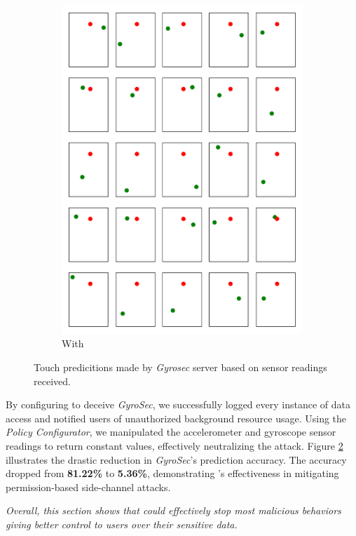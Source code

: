\begin{figure}
\begin{subfigure}{0.30\linewidth}
    \includegraphics[width=\linewidth]{Figures/Side Channel Attacks/touch_prediction_samples_by_GyroSec_with_Deceiver.pdf}
    \caption{With \framework{}}
    \label{fig:tchPredict_w_frmwrk}
\end{subfigure}
\caption{Touch predicitions made by \textit{Gyrosec} server based on sensor readings received.}
\label{fig:tchPredict}
\end{figure}

By configuring \framework{} to deceive \textit{GyroSec}, we successfully logged every instance of data access and notified users of unauthorized background resource usage. Using the \textit{Policy Configurator}, we manipulated the accelerometer and gyroscope sensor readings to return constant values, effectively neutralizing the attack. Figure \ref{fig:tchPredict} illustrates the drastic reduction in \textit{GyroSec}'s prediction accuracy. The accuracy dropped from \textbf{81.22\%} to \textbf{5.36\%}, demonstrating \framework{}'s effectiveness in mitigating permission-based side-channel attacks.

\textit{Overall, this section shows that \framework could effectively stop most 
malicious behaviors giving better control to users over their sensitive data.}
